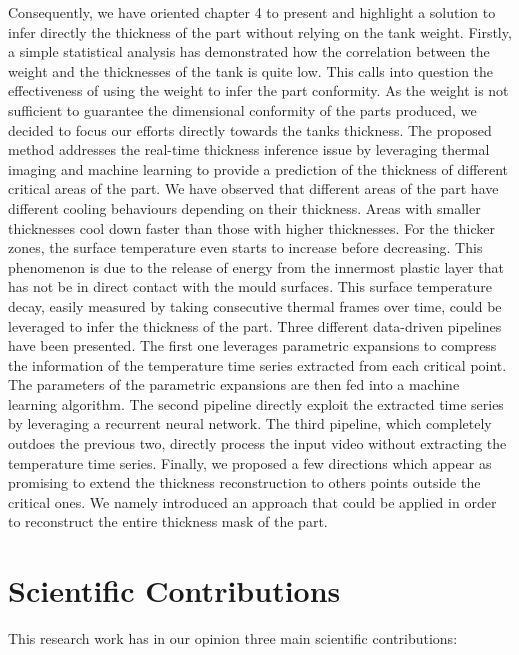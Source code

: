 Consequently, we have oriented chapter 4 to present and highlight a solution to infer directly the thickness of the part without relying on the tank weight. Firstly, a simple statistical analysis has demonstrated how the correlation between the weight and the thicknesses of the tank is quite low. This calls into question the effectiveness of using the weight to infer the part conformity. As the weight is not sufficient to guarantee the dimensional conformity of the parts produced, we decided to focus our efforts directly towards the tanks thickness. The proposed method addresses the real-time thickness inference issue by leveraging thermal imaging and machine learning to provide a prediction of the thickness of different critical areas of the part. We have observed that different areas of the part have different cooling behaviours depending on their thickness. Areas with smaller thicknesses cool down faster than those with higher thicknesses. For the thicker zones, the surface temperature even starts to increase before decreasing. This phenomenon is due to the release of energy from the innermost plastic layer that has not be in direct contact with the mould surfaces. This surface temperature decay, easily measured by taking consecutive thermal frames over time, could be leveraged to infer the thickness of the part. Three different data-driven pipelines have been presented. The first one leverages parametric expansions to compress the information of the temperature time series extracted from each critical point. The parameters of the parametric expansions are then fed into a machine learning algorithm. The second pipeline directly exploit the extracted time series by leveraging a recurrent neural network. The third pipeline, which completely outdoes the previous two, directly process the input video without extracting the temperature time series. Finally, we proposed a few directions which appear as promising to extend the thickness reconstruction to others points outside the critical ones. We namely introduced an approach that could be applied in order to reconstruct the entire thickness mask of the part.


\section*{Scientific Contributions}

This research work has in our opinion three main scientific contributions:

